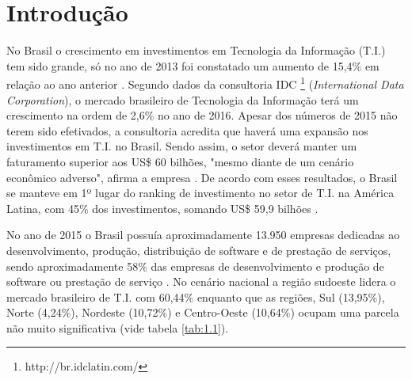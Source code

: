 \chapter{Introdução}
\label{cap:intro}




No Brasil o crescimento em investimentos em Tecnologia da Informação (T.I.) tem sido grande, só no ano de 2013 foi constatado um aumento de 15,4\% em relação ao ano anterior \cite{SilvaDias2015}. Segundo dados da consultoria IDC \footnote{http://br.idclatin.com/} (\textit{International Data Corporation}), o mercado brasileiro de Tecnologia da Informação terá um crescimento na ordem de 2,6\% no ano de 2016. Apesar dos números de 2015 não terem sido efetivados, a consultoria acredita que haverá uma expansão nos investimentos em T.I. no Brasil. Sendo assim, o setor deverá manter um faturamento superior aos US\$ 60 bilhões, "mesmo diante de um cenário econômico adverso", afirma a empresa \cite{FelipeDreher2016}. De acordo com esses resultados, o Brasil se manteve em 1º lugar do ranking de investimento no setor de T.I. na América Latina, com 45\% dos investimentos, somando US\$ 59,9 bilhões \cite{FelipeDreher2016}.

No ano de 2015 o Brasil possuía aproximadamente 13.950 empresas dedicadas ao desenvolvimento, produção, distribuição de software e de prestação de serviços, sendo aproximadamente 58\% das empresas de desenvolvimento e produção de software ou prestação de serviço \cite{abranet2016}. No cenário nacional a região sudoeste lidera o mercado brasileiro de T.I. com 60,44\% enquanto que as regiões, Sul (13,95\%), Norte (4,24\%), Nordeste (10,72\%) e Centro-Oeste (10,64\%) ocupam uma parcela não muito significativa (vide tabela \ref{tab:1.1}).

